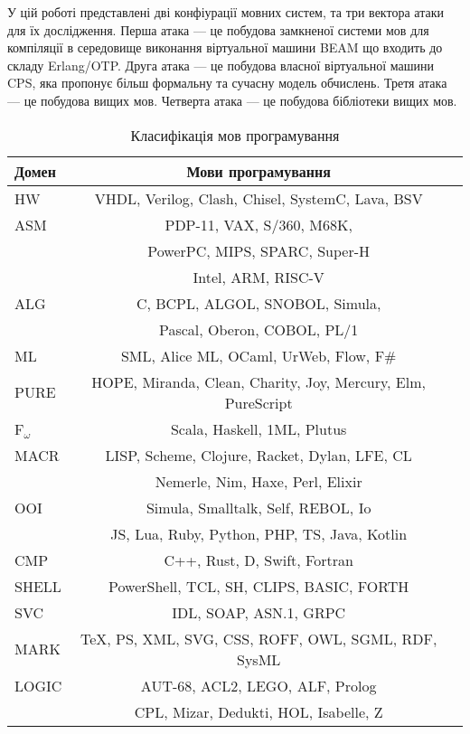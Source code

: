 У цій роботі представлені дві конфіурації мовних систем, та три вектора атаки для їх дослідження.
Перша атака --- це побудова замкненої системи мов для компіляції в середовище виконання віртуальної машини BEAM що входить до складу Erlang/OTP.
Друга атака --- це побудова власної віртуальної машини CPS, яка пропонує більш формальну та сучасну модель обчислень.
Третя атака --- це побудова вищих мов.
Четверта атака --- це побудова бібліотеки вищих мов.

\begin{table}[ht]
 \caption{Класифікація мов програмування}
  \begin{tabular}{lcc}
   \hline
       \textbf{Домен} & \textbf{Мови програмування} \\
    \hline
       HW & VHDL, Verilog, Clash, Chisel, SystemC, Lava, BSV \\
    \hline
       ASM & PDP-11, VAX, S/360, M68K,  \\
           & PowerPC, MIPS, SPARC, Super-H \\
           & Intel, ARM, RISC-V \\
    \hline
       ALG & C, BCPL, ALGOL, SNOBOL, Simula, \\
           & Pascal, Oberon, COBOL, PL/1 \\
    \hline
       ML & SML, Alice ML, OCaml, UrWeb, Flow, F\# \\
    \hline
       PURE & HOPE, Miranda, Clean, Charity, Joy, Mercury, Elm, PureScript \\
    \hline
       F$_\omega$ & Scala, Haskell, 1ML, Plutus \\
    \hline
       MACR & LISP, Scheme, Clojure, Racket, Dylan, LFE, CL \\
            & Nemerle, Nim, Haxe, Perl, Elixir \\
    \hline
       OOI & Simula, Smalltalk, Self, REBOL, Io \\
           & JS, Lua, Ruby, Python, PHP, TS, Java, Kotlin \\
    \hline
       CMP & C++, Rust, D, Swift, Fortran \\
    \hline
       SHELL & PowerShell, TCL, SH, CLIPS, BASIC, FORTH \\
    \hline
       SVC & IDL, SOAP, ASN.1, GRPC \\
    \hline
       MARK & TeX, PS, XML, SVG, CSS, ROFF, OWL, SGML, RDF, SysML \\
    \hline
       LOGIC & AUT-68, ACL2, LEGO, ALF, Prolog \\
             & CPL, Mizar, Dedukti, HOL, Isabelle, Z \\

\end{tabular}
\end{table}
